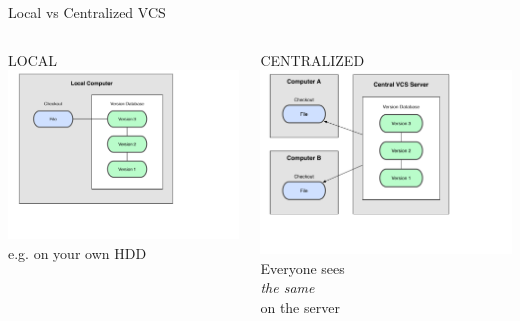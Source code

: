 \documentclass[10pt,xcolor=dvipsnames]{beamer}
\begin{document}
\begin{frame}{Local vs Centralized VCS}
\begin{columns}
\centering
{\LARGE LOCAL}\\[0.2in]
\includegraphics[scale=0.3]{VCS_local.pdf}\\
e.g. on your own HDD
\begin{center}
{\LARGE CENTRALIZED}\\[0.2in]
{\includegraphics [scale=0.3]{VCS_centralized-2.pdf}}
Everyone sees\\
\emph{the same}\\
on the server\\
\end{center}
\end{columns}
\end{frame}
\end{document}
